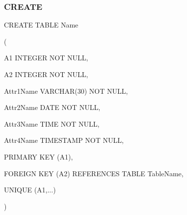 \subsubsection*{CREATE}

CREATE TABLE Name 

(

A1 INTEGER NOT NULL,

A2 INTEGER NOT NULL,

Attr1Name VARCHAR(30) NOT NULL,

Attr2Name DATE NOT NULL, 

Attr3Name TIME NOT NULL, 

Attr4Name TIMESTAMP NOT NULL,

PRIMARY KEY (A1),

FOREIGN KEY (A2) REFERENCES TABLE TableName,

UNIQUE (A1,...)

)
